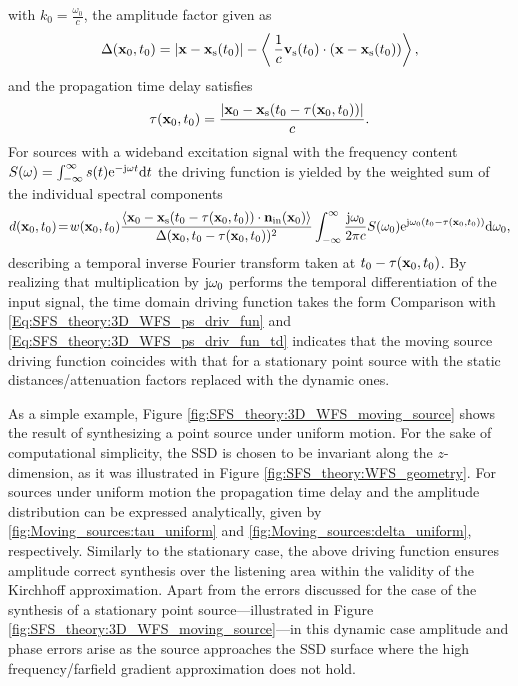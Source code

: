 with $k_0 = \frac{\omega_0}{c}$, the amplitude factor given as
\begin{equation}
\Delta( \mathbf{x}_0,t_0 ) = |\mathbf{x} - \mathbf{x}_{\mathrm{s}}(t_0)| - \left<\, \frac{1}{c}\mathbf{v}_{\mathrm{s}}(t_0) \cdot (\mathbf{x} - \mathbf{x}_{\mathrm{s}}(t_0)) \right>,
\end{equation}
and the propagation time delay satisfies 
\begin{equation}
\tau(\mathbf{x}_0,t_0) = \frac{| \mathbf{x}_0 - \mathbf{x}_{\mathrm{s}}( t_0 - \tau(\mathbf{x}_0,t_0)) |}{ c }.
\end{equation}
For sources with a wideband excitation signal with the frequency content $S(\omega) = \int_{-\infty}^{\infty} s(t) \mathrm{e}^{-\mathrm{j} \omega t} \mathrm{d} t$ the driving function is yielded by the weighted sum of the individual spectral components
\begin{equation}
d(\mathbf{x}_0,t_0) \! = \! w(\mathbf{x}_0,t_0)  
\frac{\left< \mathbf{x}_0 -\mathbf{x}_{\mathrm{s}}(t_0-\tau(\mathbf{x}_0,t_0)) \cdot \mathbf{n}_{\mathrm{in}}(\mathbf{x}_0) \right>}{\Delta(\mathbf{x}_0,t_0-\tau(\mathbf{x}_0,t_0))^2}
\int_{-\infty}^{\infty} \frac{\mathrm{j} \omega_0}{2\pi c} S(\omega_0 )\mathrm{e}^{\mathrm{j} \omega_0\left( t_0 - \tau( \mathbf{x}_0,t_0 )\right)} \mathrm{d} \omega_0,
\end{equation}
describing a temporal inverse Fourier transform taken at $t_0 - \tau( \mathbf{x}_0,t_0 )$.
By realizing that multiplication by $\mathrm{j} \omega_0$ performs the temporal differentiation of the input signal, the time domain driving function takes the form
Comparison with \eqref{Eq:SFS_theory:3D_WFS_ps_driv_fun} and \eqref{Eq:SFS_theory:3D_WFS_ps_driv_fun_td} indicates that the moving source driving function coincides with that for a stationary point source with the static distances/attenuation factors replaced with the dynamic ones.

As a simple example, Figure \ref{fig:SFS_theory:3D_WFS_moving_source} shows the result of synthesizing a point source under uniform motion.
For the sake of computational simplicity, the SSD is chosen to be invariant along the $z$-dimension, as it was illustrated in Figure \ref{fig:SFS_theory:WFS_geometry}.
For sources under uniform motion the propagation time delay and the amplitude distribution can be expressed analytically, given by \eqref{fig:Moving_sources:tau_uniform} and \eqref{fig:Moving_sources:delta_uniform}, respectively.
Similarly to the stationary case, the above driving function ensures amplitude correct synthesis over the listening area within the validity of the Kirchhoff approximation.
Apart from the errors discussed for the case of the synthesis of a stationary point source---illustrated in Figure \ref{fig:SFS_theory:3D_WFS_moving_source}---in this dynamic case amplitude and phase errors arise as the source approaches the SSD surface where the high frequency/farfield gradient approximation does not hold.

